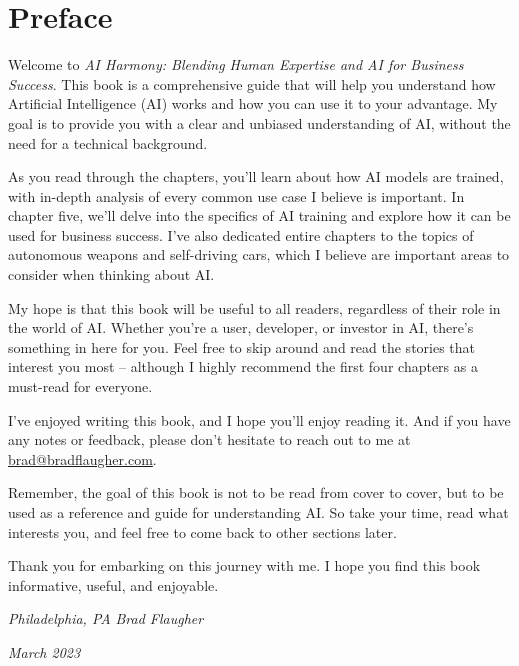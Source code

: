 \let\cleardoublepage\clearpage
\chapter*{Preface}

Welcome to \textit{AI Harmony: Blending Human Expertise and AI for Business Success}. This book is a comprehensive guide that will help you understand how Artificial Intelligence (AI) works and how you can use it to your advantage. My goal is to provide you with a clear and unbiased understanding of AI, without the need for a technical background.

As you read through the chapters, you'll learn about how AI models are trained, with in-depth analysis of every common use case I believe is important. In chapter five, we'll delve into the specifics of AI training and explore how it can be used for business success. I've also dedicated entire chapters to the topics of autonomous weapons and self-driving cars, which I believe are important areas to consider when thinking about AI.

My hope is that this book will be useful to all readers, regardless of their role in the world of AI. Whether you're a user, developer, or investor in AI, there’s something in here for you. Feel free to skip around and read the stories that interest you most – although I highly recommend the first four chapters as a must-read for everyone.

I've enjoyed writing this book, and I hope you'll enjoy reading it. And if you have any notes or feedback, please don't hesitate to reach out to me at \href{mailto:brad@bradflaugher.com}{brad@bradflaugher.com}.

Remember, the goal of this book is not to be read from cover to cover, but to be used as a reference and guide for understanding AI. So take your time, read what interests you, and feel free to come back to other sections later.

Thank you for embarking on this journey with me. I hope you find this book informative, useful, and enjoyable.

\textit{Philadelphia, PA} \hfill \textit{Brad Flaugher}

\textit{March 2023}


